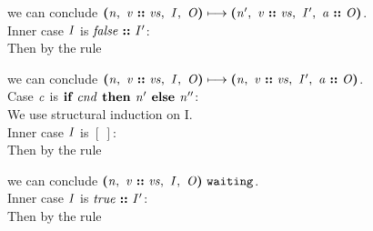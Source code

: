 \documentclass[12pt]{article}
\begin{document}
we can conclude
$\steps{
   \cfg{\nterm{n}}{\cons{\nterm{v}}{\nterm{vs}}}{\nterm{I}}{\nterm{O}}
 }{
   \cfg{\nterm{n'}}{\cons{\nterm{v}}{\nterm{vs}}}{\nterm{I'}}{\cons{\nterm{a}}{\nterm{O}}}
 }$.\\

Inner case $\nterm{I}$ is $\cons{\nterm{false}}{\nterm{I'}}$:\\

Then by the rule

\begin{mathpar}
\end{mathpar}

we can conclude
$\steps{
   \cfg{\nterm{n}}{\cons{\nterm{v}}{\nterm{vs}}}{\nterm{I}}{\nterm{O}}
 }{
   \cfg{\nterm{n}}{\cons{\nterm{v}}{\nterm{vs}}}{\nterm{I'}}{\cons{\nterm{a}}{\nterm{O}}}
 }$.\\

Case $\nterm{c}$ is $\ifelse{\nterm{cnd}}{\nterm{n'}}{\nterm{n''}}$:\\

We use structural induction on I.\\

Inner case $\nterm{I}$ is $[\ ]$:\\

Then by the rule

\begin{mathpar}
\end{mathpar}

we can conclude
$\waiting{\cfg{\nterm{n}}{\cons{\nterm{v}}{\nterm{vs}}}{\nterm{I}}{\nterm{O}}}$.\\

Inner case $\nterm{I}$ is $\cons{\nterm{true}}{\nterm{I'}}$:\\

Then by the rule

\begin{mathpar}
\end{mathpar}
\end{document}
